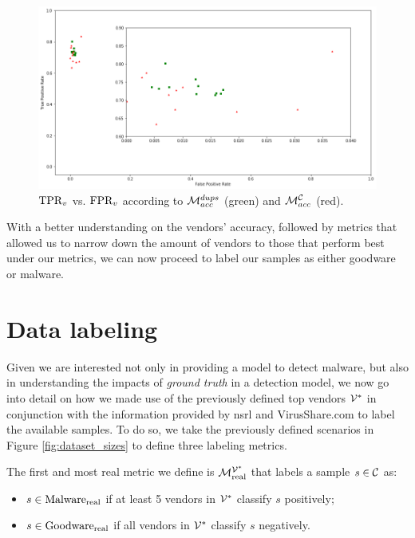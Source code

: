 \begin{figure}[!h]
	\centering
	\includegraphics[width=\columnwidth]{Figures/dr_fpr_top.png}
	\caption{$\textrm{TPR}_v$ vs. $\textrm{FPR}_v$ according to $\mathcal{M}_{acc}^{{dups}}$ (green) and $\mathcal{M}_{acc}^{\mathcal{C}}$ (red).}
	\label{fig:dr_fpr_top}
\end{figure}

With a better understanding on the vendors' accuracy, followed by metrics that allowed us to narrow down the amount of vendors to those that perform best under our metrics, we can now proceed to label our samples as either goodware or malware.

\section{Data labeling}
\label{section:data_labeling}

Given we are interested not only in providing a model to detect malware, but also in understanding the impacts of \textit{ground truth} in a detection model, we now go into detail on how we made use of the previously defined top vendors $\mathcal{V}^*$ in conjunction with the information provided by \gls{nsrl} and VirusShare.com to label the available samples.
To do so, we take the previously defined scenarios in Figure \ref{fig:dataset_sizes} to define three labeling metrics.

The first and most real metric we define is $\mathcal{M}_{\mathrm{real}}^{\mathcal{V}^*}$ that labels a sample $s\in\mathcal{C}$ as:

\begin{itemize}
	\item $s\in\mathrm{Malware}_{\mathrm{real}}$ if at least 5 vendors in $\mathcal{V}^*$ classify $s$ positively;
	\item $s\in\mathrm{Goodware}_{\mathrm{real}}$ if all vendors in $\mathcal{V}^*$ classify $s$ negatively.
\end{itemize}

